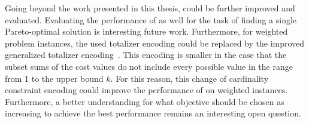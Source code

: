 Going beyond the work presented in this thesis, \algname{} could be further improved and evaluated.
Evaluating the performance of \algname{} as well for the task of finding a single Pareto-optimal solution is interesting future work.
Furthermore, for weighted problem instances, the used totalizer encoding could be replaced by the improved generalized totalizer encoding~\autocite{DBLP:conf/cp/0001MM15}.
This encoding is smaller in the case that the subset sums of the cost values do not include every possible value in the range from 1 to the upper bound $k$.
For this reason, this change of cardinality constraint encoding could improve the performance of \algname{} on weighted instances.
Furthermore, a better understanding for what objective should be chosen as increasing to achieve the best performance remains an interesting open question.